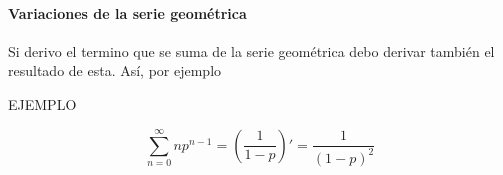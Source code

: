 \paragraph{Variaciones de la serie geométrica} Si derivo el termino que se suma de la serie
geométrica debo derivar también el resultado de esta. Así, por ejemplo

EJEMPLO

$$\sum_{n=0}^\infty n p^{n-1} = \left(\frac{1}{1-p}\right)' = \frac{1}{(1-p)^2}$$
\printindex

\nocite{prieto2008}
\printbibliography


